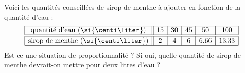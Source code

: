 
\begin{exercice}\label{exo2smath-0118}

    Voici les quantités conseillées de sirop de menthe à ajouter en fonction de la quantité d'eau :
    \begin{equation*}
        \begin{array}[]{|c||c|c|c|c|c|}
            \hline
            \text{quantité d'eau (\si{\centi\liter})}&15&30&45&50&100\\
              \hline\hline
              \text{sirop de menthe (\si{\centi\liter})}&2&4&6&6.66&13.33\\ 
              \hline 
               \end{array}
     \end{equation*}
     Est-ce une situation de proportionnalité ? Si oui, quelle quantité de sirop de menthe devrait-on mettre pour deux litres d'eau ?
           

\end{exercice}
